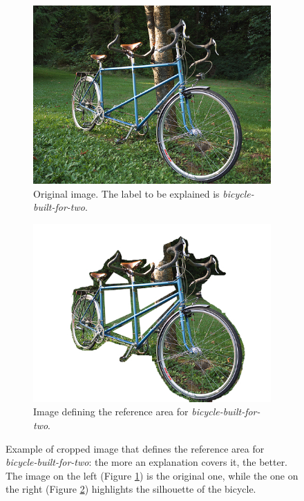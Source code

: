 \documentclass[12pt, twoside, a4paper]{report}
\begin{document}
\begin{figure}
\centering
\begin{subfigure}[b]{.49\linewidth}
\includegraphics[width=\linewidth]{images/original.JPEG}
\caption{Original image. The label to be explained is \textit{bicycle-built-for-two}.}
\label{subfig:gt_orig}
\end{subfigure}
\begin{subfigure}[b]{.49\linewidth}
\includegraphics[width=\linewidth]{images/ground_truth.jpg}
\caption{Image defining the reference area for \textit{bicycle-built-for-two}.}
\label{subfig:gt_groundtruth}
\end{subfigure}
\caption{Example of cropped image that defines the reference area for \textit{bicycle-built-for-two}: the more an explanation covers it, the better. The image on the left (Figure \ref{subfig:gt_orig}) is the original one, while the one on the right (Figure \ref{subfig:gt_groundtruth}) highlights the silhouette of the bicycle.}
\label{fig:ground_truth}
\end{figure}
\end{document}
